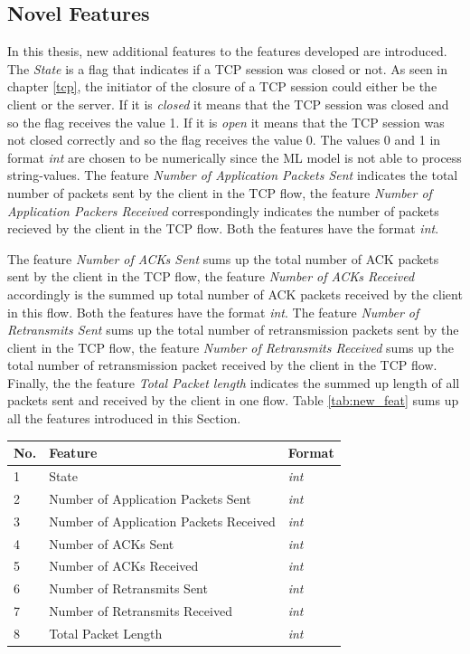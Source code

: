 \subsection{Novel Features} \label{new_feat}
In this thesis, new additional features to the features \cite{montazerishatoori2020anomaly} developed are introduced. The \textit{State} is a flag that indicates if a TCP session was closed or not. As seen in chapter \ref{tcp}, the initiator of the closure of a TCP session could either be the client or the server. If it is \textit{closed} it means that the TCP session was closed and so the flag receives the value 1. If it is \textit{open} it means that the TCP session was not closed correctly and so the flag receives the value 0. The values 0 and 1 in format \textit{int} are chosen to be numerically since the ML model is not able to process string-values. The feature \textit{Number of Application Packets Sent} indicates the total number of packets sent by the client in the TCP flow, the feature \textit{Number of Application Packers Received} correspondingly indicates the number of packets recieved by the client in the TCP flow. Both the features have the format \textit{int}. 

The feature \textit{Number of ACKs Sent} sums up the total number of ACK packets sent by the client in the TCP flow, the feature \textit{Number of ACKs Received} accordingly is the summed up total number of ACK packets received by the client in this flow. Both the features have the format \textit{int}. The feature \textit{Number of Retransmits Sent} sums up the total number of retransmission packets sent by the client in the TCP flow, the feature \textit{Number of Retransmits Received} sums up the total number of retransmission packet received by the client in the TCP flow. Finally, the the feature \textit{Total Packet length} indicates the summed up length of all packets sent and received by the client in one flow. Table \ref{tab:new_feat} sums up all the features introduced in this Section.

\begin{center}
\begin{tabular}{ |l|l|l| }
\hline
No. & Feature & Format \\
\hline
1 & State & \textit{int} \\
\hline
2 & Number of Application Packets Sent & \textit{int} \\
\hline
3 & Number of Application Packets Received & \textit{int} \\
\hline
4 & Number of ACKs Sent & \textit{int} \\
\hline
5 & Number of ACKs Received & \textit{int} \\
\hline
6 & Number of Retransmits Sent & \textit{int} \\
\hline
7 & Number of Retransmits Received & \textit{int} \\
\hline
8 & Total Packet Length & \textit{int} \\
\hline
\end{tabular}
\label{tab:new_feat}
\end{center}

